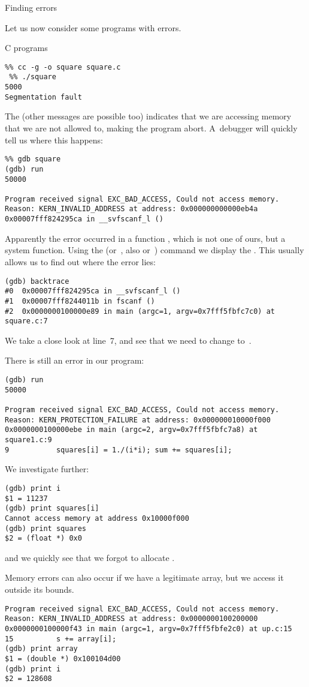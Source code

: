  {Finding errors}

Let us now consider some programs with errors.

 {C programs}

\begin{verbatim}
%% cc -g -o square square.c
 %% ./square
5000
Segmentation fault
\end{verbatim}
The  (other messages are possible too) 
indicates that we are accessing
memory that we are not allowed to, making the program
abort. A~debugger will quickly tell us where this happens:
\begin{verbatim}
%% gdb square
(gdb) run
50000

Program received signal EXC_BAD_ACCESS, Could not access memory.
Reason: KERN_INVALID_ADDRESS at address: 0x000000000000eb4a
0x00007fff824295ca in __svfscanf_l ()
\end{verbatim}
Apparently the error occurred in a function , which is
not one of ours, but a system function. Using the 
(or~, also  or~) command we
display the . This usually allows us to find out
where the error lies:
{\small
\begin{verbatim}
(gdb) backtrace
#0  0x00007fff824295ca in __svfscanf_l ()
#1  0x00007fff8244011b in fscanf ()
#2  0x0000000100000e89 in main (argc=1, argv=0x7fff5fbfc7c0) at square.c:7
\end{verbatim}
}
We take a close look at line~7, and see that we need to
change  to~.

There is still an error in our program:
{\small
\begin{verbatim}
(gdb) run
50000

Program received signal EXC_BAD_ACCESS, Could not access memory.
Reason: KERN_PROTECTION_FAILURE at address: 0x000000010000f000
0x0000000100000ebe in main (argc=2, argv=0x7fff5fbfc7a8) at square1.c:9
9           squares[i] = 1./(i*i); sum += squares[i];
\end{verbatim}
}
We investigate further:
\begin{verbatim}
(gdb) print i
$1 = 11237
(gdb) print squares[i]
Cannot access memory at address 0x10000f000
(gdb) print squares
$2 = (float *) 0x0
\end{verbatim}
and we quickly see that we forgot to allocate .

Memory errors can also occur if we have a legitimate array, but we access it
outside its bounds.
\begin{verbatim}
Program received signal EXC_BAD_ACCESS, Could not access memory.
Reason: KERN_INVALID_ADDRESS at address: 0x0000000100200000
0x0000000100000f43 in main (argc=1, argv=0x7fff5fbfe2c0) at up.c:15
15          s += array[i];
(gdb) print array
$1 = (double *) 0x100104d00
(gdb) print i
$2 = 128608
\end{verbatim}

